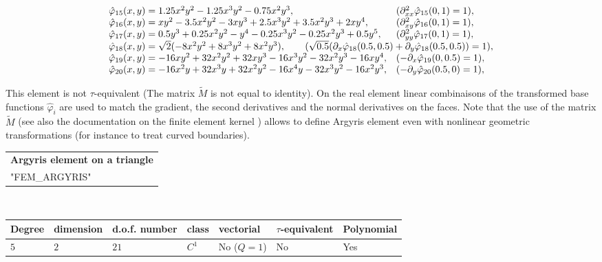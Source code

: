 \documentclass[10pt,a4paper]{article}
\begin{document}
$$\begin{array}{ll}
\hat{\varphi}_{15}(x,y) = 1.25x^2y^2 - 1.25x^3y^2 - 0.75x^2y^3, & (\partial^2_{xx}\hat{\varphi}_{15}(0,1) = 1),\\
\hat{\varphi}_{16}(x,y) = xy^2 - 3.5x^2y^2 - 3xy^3 + 2.5x^3y^2 + 3.5x^2y^3 + 2xy^4, & (\partial^2_{xy}\hat{\varphi}_{16}(0,1) = 1),\\
\hat{\varphi}_{17}(x,y) = 0.5y^3 + 0.25x^2y^2 - y^4 - 0.25x^3y^2 - 0.25x^2y^3 + 0.5y^5, & (\partial^2_{yy}\hat{\varphi}_{17}(0,1) = 1),\\
\hat{\varphi}_{18}(x,y) = \sqrt{2}(-8x^2y^2 + 8x^3y^2 + 8x^2y^3), & \hspace*{-9.5em}(\sqrt{0.5}(\partial_{x}\hat{\varphi}_{18}(0.5,0.5) + \partial_{y}\hat{\varphi}_{18}(0.5,0.5)) = 1),\\
\hat{\varphi}_{19}(x,y) = -16xy^2 + 32x^2y^2 + 32xy^3 - 16x^3y^2 - 32x^2y^3 - 16xy^4, & (-\partial_{x}\hat{\varphi}_{19}(0,0.5) = 1),\\
\hat{\varphi}_{20}(x,y) = -16x^2y + 32x^3y + 32x^2y^2 - 16x^4y - 32x^3y^2 - 16x^2y^3, & (-\partial_{y}\hat{\varphi}_{20}(0.5,0) = 1),\\
\end{array}
$$

This element is not \mbox{$\tau$-equivalent} (The matrix $\tilde{M}$ is not equal to identity). On the real element linear combinaisons of the transformed base functions $\hat{\varphi}_i$ are used to match the gradient, the second derivatives and the normal derivatives on the faces. Note that the use of the matrix  $\tilde{M}$ (see also the documentation on the finite element kernel \cite{BAS_COMP}) allows to define Argyris element even with nonlinear geometric transformations (for instance to treat curved boundaries).


\begin{center}
\begin{tabular}{|m{16.11cm}|} \hline 
{ \bf Argyris element on a triangle}\\
"FEM\_ARGYRIS"
\end{tabular} \\ \vspace{-1pt}
\begin{tabular}{|m{2cm}|m{2cm}|m{2.5cm}|m{1.2cm}|m{2cm}|m{2cm}|m{1.8cm}|} \hline 
Degree & dimension & d.o.f. number & class & vectorial & \mbox{$\tau$-equivalent} & Polynomial\\ \hline
$5$ & $2$ & $21$ & $C^1$ & No \mbox{($Q = 1$)} & No & Yes\\ \hline
\end{tabular}
\end{center}
\end{document}
